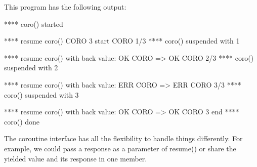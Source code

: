 This program has the following output:

\begin{shell}
**** coro() started

**** resume coro()
         CORO 3 start
         CORO 1/3
**** coro() suspended with 1

**** resume coro() with back value: OK
         CORO => OK
         CORO 2/3
**** coro() suspended with 2

**** resume coro() with back value: ERR
         CORO => ERR
         CORO 3/3
**** coro() suspended with 3

**** resume coro() with back value: OK
         CORO => OK
         CORO 3 end
**** coro() done
\end{shell}

The coroutine interface has all the flexibility to handle things differently. For example, we could pass a response as a parameter of resume() or share the yielded value and its response in one member.










